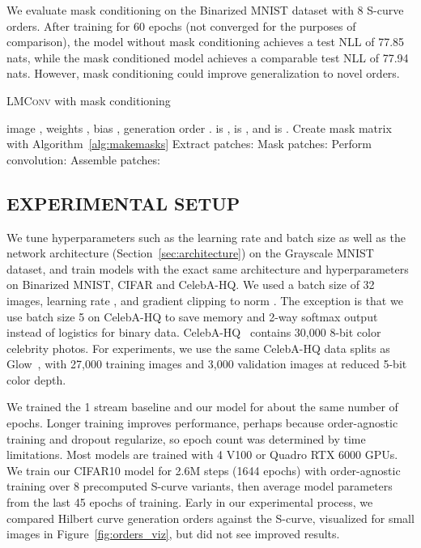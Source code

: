 \documentclass[letterpaper]{article}
\begin{document}
We evaluate mask conditioning on the Binarized MNIST dataset with 8 S-curve orders. After training for 60 epochs (not converged for the purposes of comparison), the model without mask conditioning achieves a test NLL of 77.85 nats, while the mask conditioned model achieves a comparable test NLL of 77.94 nats. However, mask conditioning could improve generalization to novel orders.

\begin{algorithm}[t]
  \caption{\textsc{LMConv} with {\color{ForestGreen} mask conditioning}}
  \label{alg:lmconv_mc}
\begin{algorithmic}[1]
   image , weights , bias , generation order .  is ,  is , and {\color{ForestGreen}  is }.
  \STATE Create mask matrix  with Algorithm~\ref{alg:makemasks}
  \STATE Extract patches: 
  \STATE Mask patches: 
  \STATE Perform convolution: 
  \STATE Assemble patches: 
\end{algorithmic}
\end{algorithm}

\subsection{EXPERIMENTAL SETUP}
\label{sec:experimental_setup}
\vspace{-2mm}

We tune hyperparameters such as the learning rate and batch size as well as the network architecture (Section~\ref{sec:architecture}) on the Grayscale MNIST dataset, and train models with the exact same architecture and hyperparameters on Binarized MNIST, CIFAR and CelebA-HQ. We used a batch size of 32 images, learning rate , and gradient clipping to norm . The exception is that we use batch size 5 on CelebA-HQ to save memory and 2-way softmax output instead of logistics for binary data. CelebA-HQ~\citep{karras2018progressive} contains 30,000  8-bit color celebrity photos. For experiments, we use the same CelebA-HQ data splits as Glow~\citep{kingma2018glow}, with 27,000 training images and 3,000 validation images at reduced 5-bit color depth.

We trained the 1 stream baseline and our model for about the same number of epochs. Longer training improves performance, perhaps because order-agnostic training and dropout regularize, so epoch count was determined by time limitations. Most models are trained with 4 V100 or Quadro RTX 6000 GPUs. We train our CIFAR10 model for 2.6M steps (1644 epochs) with order-agnostic training over 8 precomputed S-curve variants, then average model parameters from the last 45 epochs of training. Early in our experimental process, we compared Hilbert curve generation orders against the S-curve, visualized for small images in Figure~\ref{fig:orders_viz}, but did not see improved results.
\end{document}
